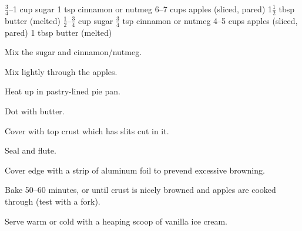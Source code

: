 \dishtype{}
\begin{ingreds}
        $\frac{3}{4}$--1 cup sugar
        1 tsp cinnamon or nutmeg
        6--7 cups apples (sliced, pared)
        1$\frac{1}{2}$ tbsp butter (melted)
        $\frac{1}{2}$--$\frac{3}{4}$ cup sugar
        $\frac{3}{4}$ tsp cinnamon or nutmeg
        4--5 cups apples (sliced, pared)
        1 tbsp butter (melted)
\end{ingreds}
\begin{method}
    Mix the sugar and cinnamon/nutmeg.\par
    Mix lightly through the apples.\par
    Heat up in pastry-lined pie pan.\par
    Dot with butter.\par
    Cover with top crust which has slits cut in it.\par
    Seal and flute.\par
    Cover edge with a strip of aluminum foil to prevend excessive browning.\par
    Bake 50--60 minutes, or until crust is nicely browned and apples are cooked through (test with a fork).\par
    Serve warm or cold with a heaping scoop of vanilla ice cream.    
\end{method}